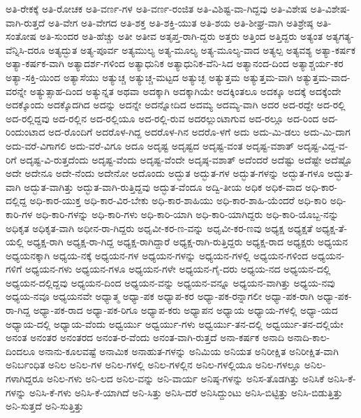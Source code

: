 {ಅತಿ-ರೇಕಕ್ಕೆ
ಅತಿ-ರೋಚಕ
ಅತಿ-ವರ್ಣ-ಗಳ
ಅತಿ-ವರ್ಣ-ರಂಜಿತ
ಅತಿ-ವಿಶಿಷ್ಟ-ವಾ-ಗಿದ್ದವು
ಅತಿ-ವಿಶೇಷ
ಅತಿ-ವಿಶೇಷ-ವಾಗಿ-ರುತ್ತದೆ
ಅತಿ-ವೇಗ
ಅತಿ-ವೇಗದ
ಅತಿ-ಶಕ್ತ
ಅತಿ-ಶಕ್ತಿ-ಯುತ
ಅತಿ-ಶಯ
ಅತಿ-ಶೀಘ್ರ-ವಾಗಿ
ಅತಿಶ್ರೇಷ್ಠ
ಅತಿ-ಸಂತೋಷ
ಅತಿ-ಸುಂದರ
ಅತಿ-ಹೆಚ್ಚು
ಅತೀ
ಅತೀವ
ಅತೃಪ್ತ-ರಾಗಿ-ದ್ದರು
ಅತ್ತರು
ಅತ್ತಿಂದ
ಅತ್ತಿದ್ದರು
ಅತ್ಯಂತ
ಅತ್ಯಗತ್ಯ-ವೆನ್ನಿಸಿ-ದರೂ
ಅತ್ಯದ್ಭುತ
ಅತ್ಯ-ಪೂರ್ವ
ಅತ್ಯಮುಲ್ಯ
ಅತ್ಯ-ಮೂಲ್ಯ
ಅತ್ಯ-ಮೂಲ್ಯ-ವಾದ
ಅತ್ಯಲ್ಪ
ಅತ್ಯವಶ್ಯ
ಅತ್ಯಾ-ಕರ್ಷಕ
ಅತ್ಯಾ-ಕರ್ಷಕ-ವಾಗಿ
ಅತ್ಯಾದರ್ಶ-ಗಳಿಂದ
ಅತ್ಯಾಧುನಿಕ
ಅತ್ಯಾಧುನಿಕ-ವೆನಿ-ಸಿದ
ಅತ್ಯಾನಂದ-ದಿಂದ
ಅತ್ಯಾಶ್ಚರ್ಯ-ಕರ
ಅತ್ಯಾ-ಸಕ್ತಿ-ಯಿಂದ
ಅತ್ಯಾಸೆಯು
ಅತ್ಯುಚ್ಚ
ಅತ್ಯುಚ್ಚ-ಮಟ್ಟದ
ಅತ್ಯುಚ್ಛ
ಅತ್ಯುತ್ತಮ
ಅತ್ಯುತ್ತಮ-ವಾಗಿ
ಅತ್ಯುತ್ತಮ-ವಾದ-ವರನ್ನೇ
ಅತ್ಯುತ್ಸಾಹ-ದಿಂದ
ಅತ್ಯುನ್ನತ
ಅಥವಾ
ಅದಕ್ಕಾಗಿ
ಅದಕ್ಕಾಗಿಯೇ
ಅದಕ್ಕಿಂತಲೂ
ಅದಕ್ಕೂ
ಅದಕ್ಕೆ
ಅದಕ್ಕೆಂದೇ
ಅದಕ್ಕೊಂದು
ಅದಕ್ಕೊದಗಿದ
ಅದನ್ನು
ಅದನ್ನೇ
ಅದನ್ನೋದಿದ
ಅದಮ್ಯ
ಅದಮ್ಯ-ವಾಗಿ
ಅದರ
ಅದ-ರದ್ದೇ
ಅದ-ರಲ್ಲಿ
ಅದ-ರಲ್ಲಿದ್ದವು
ಅದ-ರಲ್ಲಿನ
ಅದ-ರಲ್ಲಿಯೂ
ಅದ-ರಲ್ಲಿ-ರುವ
ಅದರಲ್ಲುಂಟಾಗುವ
ಅದ-ರಲ್ಲೂ
ಅದ-ರಿಂದ
ಅದ-ರಿಂದುಂಟಾದ
ಅದ-ರೊಂದಿಗೆ
ಅದರೊಳ-ಗಿದ್ದ
ಅದರೊಳ-ಗಿನ
ಅದರೊ-ಳಗೆ
ಅದು
ಅದು-ಮಿ-ಡಲು
ಅದು-ಮಿ-ದಾಗ
ಅದು-ವರೆ-ವಿಗಾಗಲಿ
ಅದು-ವರೆ-ವಿಗೂ
ಅದೂ
ಅದೃಷ್ಟ
ಅದೃಷ್ಟದ
ಅದೃಷ್ಟ-ವಂತ
ಅದೃಷ್ಟ-ವಶಾತ್
ಅದೃಷ್ಟ-ವಿದ್ದ-ವ-ರಿಗೆ
ಅದೃಷ್ಟ-ವಿ-ರುತ್ತದೆಂದು
ಅದೃಷ್ಟ-ವೆಂದು
ಅದೃಷ್ಟ-ವೆಂದೇ
ಅದೃಷ್ಠ-ವಶಾತ್
ಅದೆಂದರೆ
ಅದೆಷ್ಟು
ಅದೆಷ್ಟೇ
ಅದೆಷ್ಟೊ
ಅದೇ
ಅದೇನೂ
ಅದೇ-ನೆಂದು
ಅದೇನೋ
ಅದೊಂದು
ಅದ್ಭುತ
ಅದ್ಭುತ-ಗಳ
ಅದ್ಭುತ-ಗಳನ್ನು
ಅದ್ಭುತ-ಗಳೂ
ಅದ್ಭುತ-ವಾಗಿ
ಅದ್ಭುತ-ವಾಗಿತ್ತು
ಅದ್ಭುತ-ವಾಗಿ-ರುತ್ತಿದ್ದವು
ಅದ್ಭುತ-ವೆಂದೂ
ಅದ್ವಿ-ತೀಯ
ಅಧಿಕ
ಅಧಿಕ-ವಾದ
ಅಧಿ-ಕಾರ-ದಲ್ಲಿದ್ದ
ಅಧಿ-ಕಾರ-ಯುಕ್ತ
ಅಧಿ-ಕಾರ-ವಿರ-ಬೇಕು
ಅಧಿ-ಕಾರ-ಶಾಹಿಯು
ಅಧಿ-ಕಾರ-ಶಾಹಿ-ಯೆಂದರೆ
ಅಧಿ-ಕಾರಿ
ಅಧಿ-ಕಾರಿ-ಗಳ
ಅಧಿ-ಕಾರಿ-ಗಳನ್ನು
ಅಧಿ-ಕಾರಿ-ಗಳು
ಅಧಿ-ಕಾರಿ-ಯಾಗಿ
ಅಧಿ-ಕಾರಿ-ಯಾಗಿದ್ದರು
ಅಧಿ-ಕಾರಿ-ಯೊಬ್ಬ-ನನ್ನು
ಅಧಿಕೃತ
ಅಧಿಕೃತ-ವಾಗಿ
ಅಧೀನ-ರಾ-ಗಿದ್ದರು
ಅಧೃವೀ-ಕರ-ಣ-ವನ್ನು
ಅಧೃವೀ-ಕರ-ಣವು
ಅಧ್ಯಕ್ಷ
ಅಧ್ಯಕ್ಷತೆ
ಅಧ್ಯಕ್ಷ-ತೆ-ಯಲ್ಲಿ
ಅಧ್ಯಕ್ಷ-ರಾಗಿ
ಅಧ್ಯಕ್ಷ-ರಾ-ಗಿದ್ದ
ಅಧ್ಯಕ್ಷ-ರಾಗಿದ್ದಾರೆ
ಅಧ್ಯಕ್ಷ-ರಾಗಿ-ರುತ್ತಿದ್ದರು
ಅಧ್ಯಕ್ಷ-ರಾದ
ಅಧ್ಯಕ್ಷರು
ಅಧ್ಯಯನ
ಅಧ್ಯಯನಕ್ಕಾಗಿ
ಅಧ್ಯಯ-ನಕ್ಕೆ
ಅಧ್ಯಯನ-ಗಳ
ಅಧ್ಯಯನ-ಗಳನ್ನು
ಅಧ್ಯಯನ-ಗಳಲ್ಲಿ
ಅಧ್ಯಯನ-ಗಳಿಂದ
ಅಧ್ಯಯನ-ಗಳಿಗೆ
ಅಧ್ಯಯನ-ಗಳು
ಅಧ್ಯಯನ-ಗಳೂ
ಅಧ್ಯಯನ-ಗಳೇ
ಅಧ್ಯಯನ-ಗೈ-ದರು
ಅಧ್ಯಯ-ನದ
ಅಧ್ಯಯನ-ದಲ್ಲಿ
ಅಧ್ಯಯನ-ದಲ್ಲಿದ್ದವು
ಅಧ್ಯಯನ-ದಿಂದ
ಅಧ್ಯಯನ-ವನ್ನು
ಅಧ್ಯಯನ-ವನ್ನೂ
ಅಧ್ಯಯನ-ವಾಗಿತ್ತು
ಅಧ್ಯಯ-ನವು
ಅಧ್ಯಯ-ನವೂ
ಅಧ್ಯಯನವೇ
ಅಧ್ಯಾತ್ಮ
ಅಧ್ಯಾ-ಪಕ
ಅಧ್ಯಾಪ-ಕರ
ಅಧ್ಯಾ-ಪಕ-ರನ್ನಾಗಲೀ
ಅಧ್ಯಾ-ಪಕ-ರಾಗಿ
ಅಧ್ಯಾ-ಪಕ-ರಾ-ಗಿದ್ದ
ಅಧ್ಯಾ-ಪಕ-ರಾದ
ಅಧ್ಯಾ-ಪಕ-ರಿಗೂ
ಅಧ್ಯಾಪ-ಕರು
ಅಧ್ಯಾಪನ
ಅಧ್ಯಾಯ
ಅಧ್ಯಾಯ-ಗಳಲ್ಲಿ
ಅಧ್ಯಾ-ಯದ
ಅಧ್ಯಾಯ-ದಲ್ಲಿ
ಅಧ್ಯಾಯ-ವೆಂದು
ಅಧ್ವರ್ಯು
ಅಧ್ವರ್ಯು-ಗಳು
ಅಧ್ವರ್ಯು-ತನ-ದಲ್ಲಿ
ಅಧ್ವರ್ಯು-ತನ-ದಲ್ಲಿಯೇ
ಅನಂತ
ಅನಂತರ
ಅನಂತರದ
ಅನಂತ-ರ-ವೆಂದು
ಅನಂತ-ವಾಗಿ-ರುತ್ತದೆ
ಅನಾ-ಕರ್ಷಕ
ಅನಾದಿ
ಅನಾದಿ-ಕಾಲ-ದಿಂದಲೂ
ಅನಾನು-ಕೂಲವಷ್ಟೆ
ಅನಾಮಿಕ
ಅನಾಹುತ-ಗಳನ್ನು
ಅನಿಮಿಯ
ಅನಿಯತ
ಅನಿರೀಕ್ಷಿತ
ಅನಿರೀಕ್ಷಿತ-ವಾಗಿ
ಅನಿರ್ಬಂಧಿತ
ಅನಿಲ
ಅನಿಲ-ಗಳ
ಅನಿಲ-ಗಳಲ್ಲಿ
ಅನಿಲ-ಗಳಲ್ಲಿನ
ಅನಿಲ-ಗಳಲ್ಲಿಯೂ
ಅನಿಲ-ಗಳಲ್ಲೂ
ಅನಿಲ-ಗಳಾಗಿದ್ದರೂ
ಅನಿಲ-ಗಳು
ಅನಿ-ಲದ
ಅನಿಲ-ವನ್ನು
ಅನಿ-ವಾರ್ಯ
ಅನಿಷ್ಠ-ಗಳನ್ನು
ಅನಿಸ-ತೊಡಗಿತ್ತು
ಅನಿಸಿಕೆ
ಅನಿಸಿ-ಕೆ-ಗಳನ್ನು
ಅನಿಸಿ-ಕೆ-ಗಳು
ಅನಿಸಿ-ಕೆ-ಯಾಗಿದೆ
ಅನಿ-ಸಿತ್ತು
ಅನಿಸಿ-ದರೆ
ಅನಿಸಿದ್ದುಂಟು
ಅನಿಸಿ-ಬಿಟ್ಟಿತ್ತು
ಅನಿಸಿ-ಬಿಡುತ್ತಿತ್ತು
ಅನಿ-ಸುತ್ತದೆ
ಅನಿ-ಸುತ್ತಿತ್ತು
}
